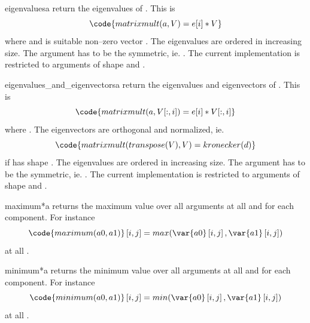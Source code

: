 \begin{funcdesc}{eigenvalues}{a}
return the eigenvalues of . This is 
\begin{equation}
\code{matrixmult(a,V)=e[i]*V}
\end{equation} 
where  and  is suitable non--zero vector . 
The eigenvalues are ordered in increasing size.
The argument  has to be the symmetric, ie. .  
The current implementation is restricted to arguments of shape 
 and .
\end{funcdesc}
\begin{funcdesc}{eigenvalues_and_eigenvectors}{a}
return the eigenvalues and eigenvectors of . This is 
\begin{equation}
\code{matrixmult(a,V[:,i])=e[i]*V[:,i]}
\end{equation} 
where . The eigenvectors  are orthogonal and normalized, ie.
\begin{equation}
\code{matrixmult(transpose(V),V)=kronecker(d)}
\end{equation} 
if  has shape . The eigenvalues are ordered in increasing size.
The argument  has to be the symmetric, ie. .  
The current implementation is restricted to arguments of shape 
 and .
\end{funcdesc}
\begin{funcdesc}{maximum}{*a}
returns the maximum value over all arguments at all \DataSamplePoints and for each component.
For instance 
\begin{equation}
\code{maximum(a0,a1)}\left[i,j\right]=max(\var{a0} \left[i,j\right],\var{a1} \left[i,j\right])
\end{equation}
at all \DataSamplePoints.
\end{funcdesc}
\begin{funcdesc}{minimum}{*a}
returns the minimum value over all arguments at all \DataSamplePoints and for each component.
For instance 
\begin{equation}
\code{minimum(a0,a1)}\left[i,j\right]=min(\var{a0} \left[i,j\right],\var{a1} \left[i,j\right])
\end{equation}
at all \DataSamplePoints.
\end{funcdesc}

